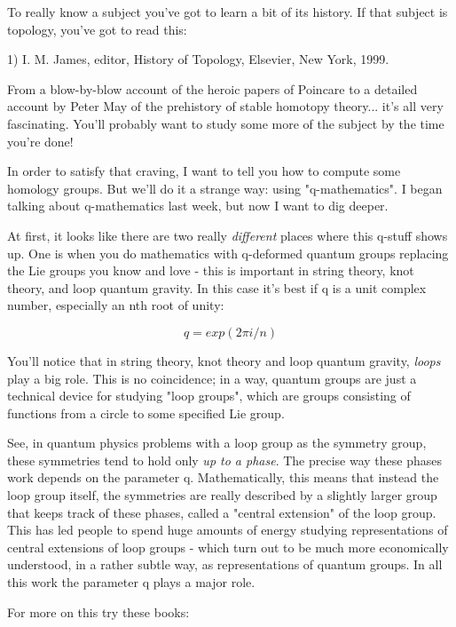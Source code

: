 



To really know a subject you've got to learn a bit of its
history.  If that subject is topology, you've got to read this:

1) I. M. James, editor, History of Topology, Elsevier, New York, 1999.  

From a blow-by-blow account of the heroic papers of Poincare to a 
detailed account by Peter May of the prehistory of stable homotopy 
theory... it's all very fascinating.  You'll probably want to study
some more of the subject by the time you're done!  

In order to satisfy that craving, I want to tell you how to compute some 
homology groups.  But we'll do it a strange way: using "q-mathematics".
I began talking about q-mathematics last week, but now I want to dig 
deeper. 

At first, it looks like there are two really \emph{different} places where
this q-stuff shows up.   One is when you do mathematics with q-deformed
quantum groups replacing the Lie groups you know and love - this is
important in string theory, knot theory, and loop quantum gravity.  
In this case it's best if q is a unit complex number, especially an
nth root of unity:


$$

q = exp(2\pi i/n)
$$
    
You'll notice that in string theory, knot theory and loop quantum
gravity, \emph{loops} play a big role.  This is no coincidence; in a way,
quantum groups are just a technical device for studying "loop groups",
which are groups consisting of functions from a circle to some
specified Lie group.  

See, in quantum physics problems with a loop group as the symmetry
group, these symmetries tend to hold only \emph{up to a phase}.  The precise
way these phases work depends on the parameter q.  Mathematically, this
means that instead the loop group itself, the symmetries are really
described by a slightly larger group that keeps track of these phases,
called a "central extension" of the loop group.  This has led people 
to spend huge amounts of energy studying representations of central
extensions of loop groups - which turn out to be much more economically
understood, in a rather subtle way, as representations of quantum groups.  
In all this work the parameter q plays a major role.  

For more on this try these books:

